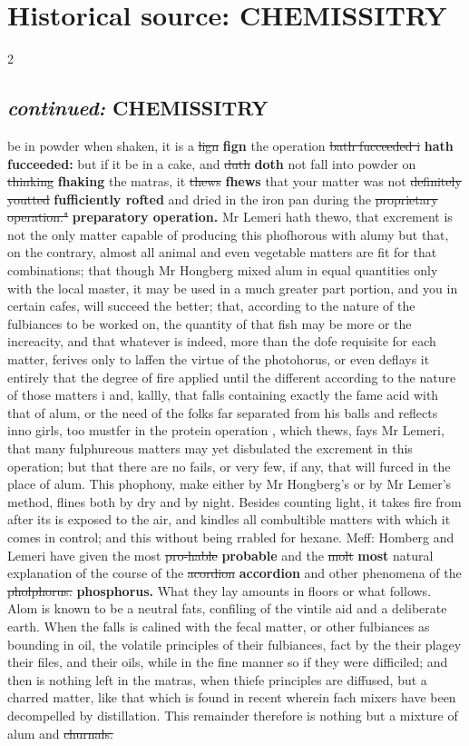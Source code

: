 \documentclass[10pt]{article}
\begin{document}
\section*{Historical source: CHEMISSITRY}
\begin{multicols}{2}
\subsection*{\textit{continued:} CHEMISSITRY}
be in powder when shaken, it is a \sout{lign} \textbf{fign} the operation \sout{bath fucceeded i} \textbf{hath fucceeded:} but if it be in a cake, and \sout{duth} \textbf{doth} not fall into powder on \sout{thinking} \textbf{fhaking} the matras, it \sout{thews} \textbf{fhews} that your matter was not \sout{definitely youtted} \textbf{fufficiently rofted} and dried in the iron pan during the \sout{proprietary operation."} \textbf{preparatory operation.} Mr Lemeri hath thewo, that excrement is not the only matter capable of producing this phofhorous with alumy but that, on the contrary, almost all animal and even vegetable matters are fit for that combinations; that though Mr Hongberg mixed alum in equal quantities only with the local master, it may be used in a much greater part portion, and you in certain cafes, will succeed the better; that, according to the nature of the fulbiances to be worked on, the quantity of that fish may be more or the increacity, and that whatever is indeed, more than the dofe requisite for each matter, ferives only to laffen the virtue of the photohorus, or even deflays it entirely that the degree of fire applied until the different according to the nature of those matters i and, kallly, that falls containing exactly the fame acid with that of alum, or the need of the folks far separated from his balls and reflects inno girls, too mustfer in the protein operation , which thews, fays Mr Lemeri, that many fulphureous matters may yet disbulated the excrement in this operation; but that there are no fails, or very few, if any, that will furced in the place of alum. This phophony, make either by Mr Hongberg’s or by Mr Lemer’s method, flines both by dry and by night. Besides counting light, it takes fire from after its is exposed to the air, and kindles all combultible matters with which it comes in control; and this without being rrabled for hexane. Meff: Homberg and Lemeri have given the most \sout{pro-hable} \textbf{probable} and the \sout{molt} \textbf{most} natural explanation of the course of the \sout{acordion} \textbf{accordion} and other phenomena of the \sout{pholphorus.} \textbf{phosphorus.} What they lay amounts in floors or what follows. Alom is known to be a neutral fats, confiling of the vintile aid and a deliberate earth. When the falls is calined with the fecal matter, or other fulbiances as bounding in oil, the volatile principles of their fulbiances, fact by the their plagey their files, and their oils, while in the fine manner so if they were difficiled; and then is nothing left in the matras, when thiefe principles are diffused, but a charred matter, like that which is found in recent wherein fach mixers have been decompelled by distillation. This remainder therefore is nothing but a mixture of alum and \sout{churnals.} 
\end{multicols}
\end{document}
